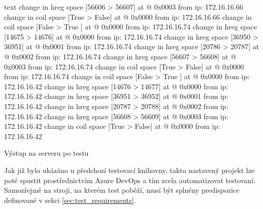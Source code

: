 \begin{listing}[htbp]
\begin{cminted}[breaklines,autogobble, fontsize=\footnotesize]{text}
        change in hreg space [56606 > 56607] at @ 0x0003 from ip: 172.16.16.66   
        change in coil space [True  > False] at @ 0x0000 from ip: 172.16.16.66   
        change in coil space [False > True ] at @ 0x0000 from ip: 172.16.16.74   
        change in hreg space [14675 > 14676] at @ 0x0000 from ip: 172.16.16.74   
        change in hreg space [36950 > 36951] at @ 0x0001 from ip: 172.16.16.74   
        change in hreg space [20786 > 20787] at @ 0x0002 from ip: 172.16.16.74   
        change in hreg space [56607 > 56608] at @ 0x0003 from ip: 172.16.16.74   
        change in coil space [True  > False] at @ 0x0000 from ip: 172.16.16.74   
        change in coil space [False > True ] at @ 0x0000 from ip: 172.16.16.42   
        change in hreg space [14676 > 14677] at @ 0x0000 from ip: 172.16.16.42   
        change in hreg space [36951 > 36952] at @ 0x0001 from ip: 172.16.16.42   
        change in hreg space [20787 > 20788] at @ 0x0002 from ip: 172.16.16.42   
        change in hreg space [56608 > 56609] at @ 0x0003 from ip: 172.16.16.42   
        change in coil space [True  > False] at @ 0x0000 from ip: 172.16.16.42   
    \end{cminted}
\caption{Výstup na serveru po testu}
\label{listing:modbus_server_log}
\end{listing}

Jak již bylo ukázáno u předchozí testovací knihovny\cite{bakalarka}, takto nastavený projekt lze poté spustit prostřednictvím Azure DevOps a tím zcela automatizovat testovaní. Samozřejmě na stroji, na kterém test poběží, musí být splněny predispozice definované v sekci \ref{sec:test_requirements}.